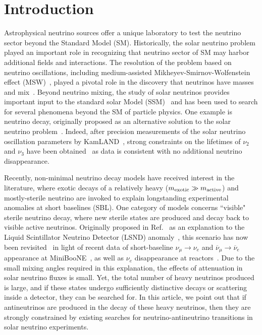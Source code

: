 \documentclass[
reprint,
superscriptaddress,
showpacs,
preprintnumbers,
nofootinbib,
nobibnotes,
amsmath,
amssymb, 
aps,
prd,
floatfix
]{revtex4-1}
\begin{document}
\section{Introduction} 
Astrophysical neutrino sources offer a unique laboratory to test the neutrino sector beyond the Standard Model (SM). 
Historically, the solar neutrino problem played an important role in recognizing that neutrino sector of SM may harbor additional fields and interactions. The resolution of the problem based on neutrino oscillations, including medium-assisted Mikheyev-Smirnov-Wolfenstein effect (MSW)~\cite{Wolfenstein:1977ue,Mikheev:1986gs}, played a pivotal role in the discovery that neutrinos have masses and mix~\cite{Fukuda:1998mi,Ahmad:2002jz}.
Beyond neutrino mixing, the study of solar neutrinos provides important input to the standard solar Model (SSM)~\cite{Bahcall:2005va,Agostini:2020mfq} and has been used to search for several phenomena beyond the SM of particle physics. One example is neutrino decay, originally proposed as an alternative solution to the solar neutrino problem~\cite{Bahcall:1972my,Pakvasa:1972gz}. Indeed, after precision measurements of the solar neutrino oscillation parameters by KamLAND~\cite{Abe:2008aa}, strong constraints on the lifetimes of $\nu_2$ and $\nu_3$ have been obtained~\cite{Joshipura:2002fb,Beacom:2002cb} as data is consistent with no additional neutrino disappearance. 

Recently, non-minimal neutrino decay models have received interest in the literature, where exotic decays of a relatively heavy ($m_{\rm exotic} \gg m_{\rm active}$) and mostly-sterile neutrino are invoked to explain longstanding experimental anomalies at short baselines (SBL). One category of models concerns ``visible" sterile neutrino decay, where new sterile states are produced and decay back to visible active neutrinos. Originally proposed in Ref.~\cite{PalomaresRuiz:2005vf} as an explanation to the Liquid Scintillator Neutrino Detector (LSND) anomaly~\cite{Athanassopoulos:1996jb,Aguilar:2001ty}, this scenario has now been revisited~\cite{deGouvea:2019qre,Dentler:2019dhz} in light of recent data of short-baseline $\nu_\mu \to \nu_e$ and $\overline{\nu}_\mu \to \overline{\nu}_e$ appearance at MiniBooNE~\cite{AguilarArevalo:2007it,Aguilar-Arevalo:2018gpe,Aguilar-Arevalo:2020nvw}, as well as $\nu_e$ disappearance at reactors~\cite{Mention:2011rk,Dentler:2017tkw}. Due to the small mixing angles required in this explanation, the effects of attenuation in solar neutrino fluxes is small. Yet, the total number of heavy neutrinos produced is large, and if these states undergo sufficiently distinctive decays or scattering inside a detector, they can be searched for. In this article, we point out that if antineutrinos are produced in the decay of these heavy neutrinos, then they are strongly constrained by existing searches for neutrino-antineutrino transitions in solar neutrino experiments. 
\end{document}

